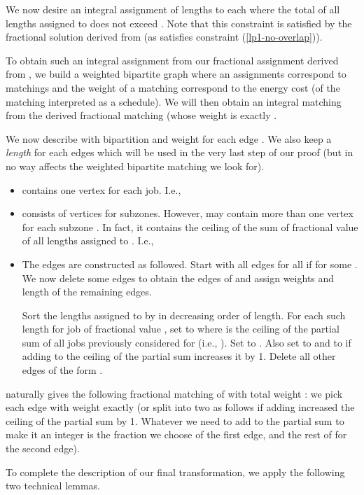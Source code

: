We now desire an integral assignment of lengths to each  where the total of all lengths assigned to  does not exceed . Note that this constraint is satisfied by the fractional solution derived from  (as  satisfies constraint (\ref{lp1-no-overlap})).

To obtain such an integral assignment from our fractional assignment derived from , we build a weighted bipartite graph  where an assignments correspond to matchings and the weight of a matching correspond to the energy cost (of the matching interpreted as a schedule). We will then obtain an integral matching from the derived fractional matching (whose weight is exactly .

We now describe  with bipartition  and weight  for each edge . We also keep a \emph{length}  for each edges which will be used in the very last step of our proof (but in no way affects the weighted bipartite matching we look for).

\begin{itemize}
\item
   contains one vertex for each job. I.e., 
\item
   consists of vertices for subzones. However,  may contain more than one vertex for each subzone . In fact, it contains the ceiling of the sum of fractional value of all lengths assigned to . I.e.,
  


\item
  The edges are constructed as followed. Start with all edges  for all  if  for some . We now delete some edges to obtain the edges of  and assign weights and length of the remaining edges.

  Sort the lengths assigned to  by  in decreasing order of length. For each such length  for job  of fractional value , set  to  where  is the ceiling of the partial sum of all jobs previously considered for  (i.e., ). Set  to . Also set  to  and  to  if adding  to the ceiling of the partial sum increases it by 1. Delete all other edges of the form .
\end{itemize}

 naturally gives the following fractional matching  of  with total weight : we pick each edge with weight exactly  (or  split into two as follows if adding  increased the ceiling of the partial sum by 1. Whatever we need to add to the partial sum to make it an integer is the fraction we choose of the first edge, and the rest of  for the second edge).

To complete the description of our final transformation, we apply the following two technical lemmas.


